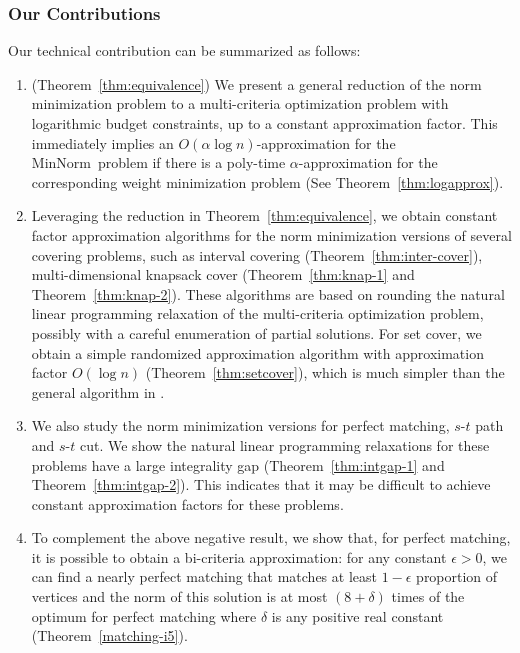 \documentclass[11pt,a4paper]{article} \usepackage{enumitem}
\newcommand{\minnorm}{\textsf{MinNorm}}
\theoremstyle{definition}
\begin{document}
\subsubsection*{Our Contributions}

Our technical contribution can be summarized as follows:
\begin{enumerate}
    \item (Theorem~\ref{thm:equivalence}) We present a general reduction of the norm minimization problem to a multi-criteria optimization problem with logarithmic budget constraints, up to a constant approximation factor.
    This immediately implies an
    $O(\alpha \log n)$-approximation for the \minnorm\ problem 
    if there is a poly-time $\alpha$-approximation for the 
    corresponding weight minimization problem (See Theorem~\ref{thm:logapprox}).
    
    \item 
    Leveraging the reduction in Theorem~\ref{thm:equivalence}, 
    we obtain constant factor approximation algorithms for the norm minimization versions of
    several covering problems,
    such as interval covering (Theorem~\ref{thm:inter-cover}), 
    multi-dimensional knapsack cover (Theorem~\ref{thm:knap-1} and Theorem~\ref{thm:knap-2}).
    These algorithms are based on rounding the natural linear programming relaxation 
    of the multi-criteria optimization problem, possibly with a careful enumeration
    of partial solutions.
    For set cover, we obtain a simple randomized approximation algorithm 
    with approximation factor $O(\log n)$ (Theorem~\ref{thm:setcover}), which is much simpler than the general algorithm in \cite{deng2022generalized}.












    
    \item 
    We also study the norm minimization versions for perfect matching, $s$-$t$ path and $s$-$t$ cut. We show the natural linear programming relaxations for these problems 
    have a large integrality gap (Theorem~\ref{thm:intgap-1} and Theorem~\ref{thm:intgap-2}). This indicates that
    it may be difficult to achieve constant approximation factors for these problems.
    
    \item 
    To complement the above negative result, we show that, for perfect matching, it is possible to obtain a bi-criteria approximation: for any constant $\epsilon>0$, we can find a nearly perfect matching that
    matches at least $1-\epsilon$ proportion of vertices
    and the norm of this solution is at most $(8+\delta)$ times of the optimum for perfect matching where $\delta$ is any positive real constant
    (Theorem~\ref{matching-i5}). 
    

\end{enumerate}
\end{document}
